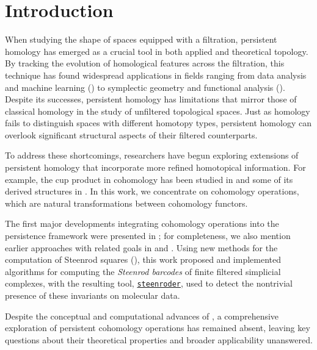 
\section{Introduction} \label{s:introduction}

When studying the shape of spaces equipped with a filtration, persistent homology has emerged as a crucial tool in both applied and theoretical topology.
By tracking the evolution of homological features across the filtration, this technique has found widespread applications in fields ranging from data analysis and machine learning (\cite{carlsson2013viral, lee2017quantifying}) to symplectic geometry and functional analysis (\cite{polterovich2020persistence, medina2023fuct_top}).
Despite its successes, persistent homology has limitations that mirror those of classical homology in the study of unfiltered topological spaces.
Just as homology fails to distinguish spaces with different homotopy types, persistent homology can overlook significant structural aspects of their filtered counterparts.

To address these shortcomings, researchers have begun exploring extensions of persistent homology that incorporate more refined homotopical information.
For example, the cup product in cohomology has been studied in \cite{contessoto_et_al:LIPIcs.SoCG.2022.31, memoli2024persistent, huang2005cup, yarmola2010persistence, contreras2022persistent} and some of its derived structures in \cite{herscovich2018higher, ginot2019distances, belchi2022persistence, zhou2023persistent, hess2024minimalmodels}.
In this work, we concentrate on cohomology operations, which are natural transformations between cohomology functors.

The first major developments integrating cohomology operations into the persistence framework were presented in \cite{medina2022per_st}; for completeness, we also mention earlier approaches with related goals in \cite{aubrey2011thesis} and \cite{postol2023persistence}.
Using new methods for the computation of Steenrod squares (\cite{medina2023fast_sq}), this work proposed and implemented algorithms for computing the \textit{Steenrod barcodes} of finite filtered simplicial complexes, with the resulting tool, \href{https://steenroder.github.io/steenroder/}{\texttt{steenroder}}, used to detect the nontrivial presence of these invariants on molecular data.

Despite the conceptual and computational advances of \cite{medina2022per_st}, a comprehensive exploration of persistent cohomology operations has remained absent, leaving key questions about their theoretical properties and broader applicability unanswered.

